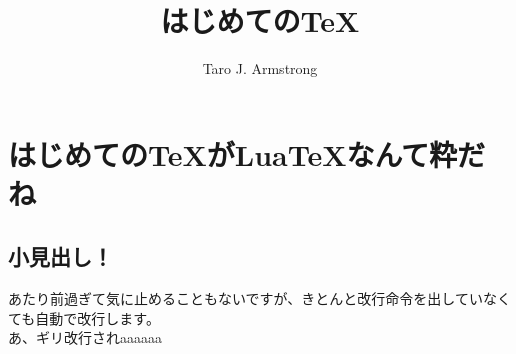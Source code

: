 \documentclass{ltjsarticle}
\begin{document}
\title{はじめての\TeX }
\author{Taro J. Armstrong}
\maketitle
\section{はじめての\TeX がLua\TeX なんて粋だね}

\subsection{小見出し！}
あたり前過ぎて気に止めることもないですが、きとんと改行命令を出していなくても自動で改行します。
\\あ、ギリ改行されaaaaaa
\end{document}

